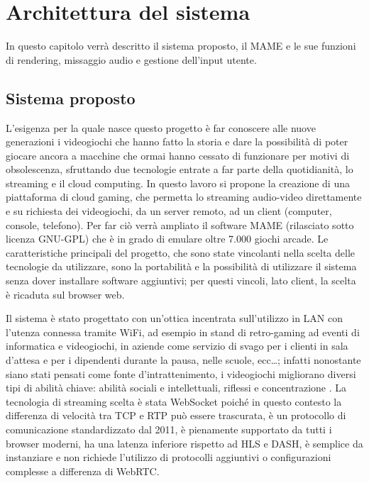 %
%

\chapter{Architettura del sistema}
In questo capitolo verrà descritto il sistema proposto, il MAME e le sue funzioni di rendering, missaggio audio e gestione dell'input utente.




\section{Sistema proposto} \label{sec:cap2_SistemaProposto}
L'esigenza per la quale nasce questo progetto è far conoscere alle nuove generazioni i videogiochi che hanno fatto la storia e dare la possibilità di poter giocare ancora a macchine che ormai hanno cessato di funzionare per motivi di obsolescenza, sfruttando due tecnologie entrate a far parte della quotidianità, lo streaming e il cloud computing. In questo lavoro si propone la creazione di una piattaforma di cloud gaming, che permetta lo streaming audio-video direttamente e su richiesta dei videogiochi, da un server remoto, ad un client (computer, console, telefono). Per far ciò verrà ampliato il software MAME (rilasciato sotto licenza GNU-GPL) che è in grado di emulare oltre 7.000 giochi arcade. Le caratteristiche principali del progetto, che sono state vincolanti nella scelta delle tecnologie da utilizzare, sono la portabilità e la possibilità di utilizzare il sistema senza dover installare software aggiuntivi; per questi vincoli, lato client, la scelta è ricaduta sul browser web.

Il sistema è stato progettato con un'ottica incentrata sull'utilizzo in LAN con l'utenza connessa tramite WiFi, ad esempio in stand di retro-gaming ad eventi di informatica e videogiochi, in aziende come servizio di svago per i clienti in sala d'attesa e per i dipendenti durante la pausa, nelle scuole, ecc\dots; infatti nonostante siano stati pensati come fonte d'intrattenimento, i videogiochi migliorano diversi tipi di abilità chiave: abilità sociali e intellettuali, riflessi e concentrazione \parencite{Use_of_Cloud_Gaming_in_Education}. La tecnologia di streaming scelta è stata WebSocket poiché in questo contesto la differenza di velocità tra TCP e RTP può essere trascurata, è un protocollo di comunicazione standardizzato dal 2011, è pienamente supportato da tutti i browser moderni, ha una latenza inferiore rispetto ad HLS e DASH, è semplice da instanziare e non richiede l'utilizzo di protocolli aggiuntivi o configurazioni complesse a differenza di WebRTC.

